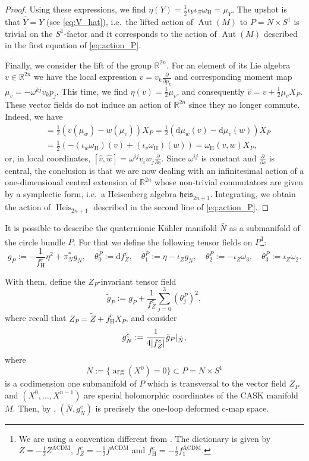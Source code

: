 \documentclass{article}
\theoremstyle{definition}
\DeclareMathOperator{\Aut}{Aut}
\DeclareMathOperator{\Heis}{Heis}
\newcommand{\R}{\mathbb{R}}
\newcommand{\hor}{\mathrm{H}}
\newcommand{\heis}{\mathfrak{heis}}
\newcommand{\pd}[2]{\frac{\partial #1}{\partial #2}}
\renewcommand{\d}{\mathrm{d}}
\DeclarePairedDelimiter{\abs}{\lvert}{\rvert}
\begin{document}
\begin{proof}
		Using these expressions, we find $\eta(Y)=\frac{1}{2}\iota_Y\iota_\Xi\omega_\hor=\mu_Y$. The upshot is that $\hat{Y}=Y$ (see \eqref{eq:V_hat}), i.e.\ the lifted action of $\Aut(M)$ to $P=N\times S^1$ is trivial on the $S^1$-factor and it corresponds to the action of $\Aut(M)$ described in the first equation of \eqref{eq:action_P}.\medskip
		
		Finally, we consider the lift of the group $\R^{2n}$. For an element of its Lie algebra $v\in\R^{2n}$ we have the local expression $v=v_k\pd{}{p_k}$ and corresponding moment map $\mu_v=-\omega^{kj}v_kp_j$. This time, we find $\eta(v)=\frac{1}{2}\mu_v$, and consequently $\hat{v}=v+\frac{1}{2}\mu_vX_P$. These vector fields do not induce an action of $\R^{2n}$ since they no longer commute. Indeed, we have \begin{align*}
			[\hat{v},\hat{w}]&=\frac{1}{2}(v(\mu_w)-w(\mu_v))X_P=\frac{1}{2}(\d\mu_w(v)-\d\mu_v(w))X_P\\
			&=\frac{1}{2}(-(\iota_w\omega_\hor)(v)+(\iota_v\omega_\hor)(w))=\omega_\hor(v,w)X_P,
		\end{align*} or, in local coordinates, $[\hat{v},\hat{w}]=\omega^{ij}v_iw_j\pd{}{s}$. Since $\omega^{ij}$ is constant and $\pd{}{s}$ is central, the conclusion is that we are now dealing with an infinitesimal action of a one-dimensional central extension of $\R^{2n}$ whose non-trivial commutators are given by a symplectic form, i.e.\ a Heisenberg algebra $\heis_{2n+1}$. Integrating, we obtain the action of $\Heis_{2n+1}$ described in the second line of \eqref{eq:action_P}.
    \end{proof}
    
    It is possible to describe the quaternionic K\"ahler manifold $\bar N$ as a submanifold of the circle bundle $P$. For that we define the following tensor fields on $P$\footnote{We are using a convention different from \cite{ACDM15}. The dictionary is given by $Z=-\frac{1}{2}Z^{\mathrm{ACDM}}$, $f_Z^c=-\frac{1}{2}f^{\mathrm{ACDM}}$ and $f_\hor^c=-\frac{1}{2}f_1^{\mathrm{ACDM}}$.}: $$g_P:=-\frac{1}{f_\hor^c}\eta^2+\pi_N^*g_N,\quad\theta_0^P:=\d f_Z^c,\quad\theta_1^P:=\eta-\iota_Zg_N,\quad\theta_2^P:=-\iota_Z\omega_3,\quad\theta_3^P:=\iota_Z\omega_2.$$
    
    With them, define the $Z_P$-invariant tensor field$$\tilde{g}_P:=g_P+\frac{1}{f_Z^c}\sum_{j=0}^3(\theta_j^P)^2,$$ where recall that $Z_P=\tilde{Z}+f_\hor^c X_P$, and consider $$g_{\bar N}^c:=\frac{1}{4\abs{f_Z^c}}\tilde{g}_P|_{\bar N},$$ where \begin{equation}\label{eq:barN_in_P}
        \bar N:=\{\arg(X^0)=0\}\subset P=N\times S^1
    \end{equation} is a codimension one submanifold of $P$ which is transversal to the vector field $Z_P$ and $(X^0,\ldots,X^{n-1})$ are special holomorphic coordinates of the CASK manifold $M$. Then, by \cite[Theorems~2 and 5]{ACDM15}, $(\bar N,g_{\bar N}^c)$ is precisely the one-loop deformed c-map space.\medskip
    
\end{document}

